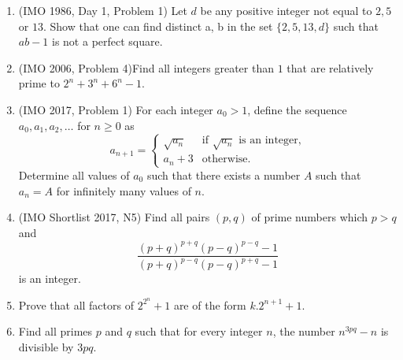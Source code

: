 \documentclass[a4paper,oneside,12 pt]{book}
\theoremstyle{definition}
\theoremstyle{definition}
\theoremstyle{definition}
\begin{document}
\begin{enumerate}
\item (IMO 1986, Day 1, Problem 1) Let $d$ be any positive integer not equal to $2, 5$ or $13$. Show that one can find distinct a, b in the set $\{2, 5, 13, d\}$ such that $ab − 1$ is not a perfect square.

\item (IMO 2006, Problem 4)Find all integers greater than $1$ that are relatively prime to $2^n+3^n+6^n-1.$

\item (IMO 2017, Problem 1) For each integer $a_0 > 1$, define the sequence $a_0, a_1, a_2, \ldots$ for $n \geq 0$ as
$$a_{n+1} = 
\begin{cases}
\sqrt{a_n} & \text{if } \sqrt{a_n} \text{ is an integer,} \\
a_n + 3 & \text{otherwise.}
\end{cases}
$$Determine all values of $a_0$ such that there exists a number $A$ such that $a_n = A$ for infinitely many values of $n$.

\item (IMO Shortlist 2017, N5) Find all pairs $(p,q)$ of prime numbers which $p>q$ and
$$\frac{(p+q)^{p+q}(p-q)^{p-q}-1}{(p+q)^{p-q}(p-q)^{p+q}-1}$$is an integer.

\item Prove that all factors of $2^{2^n}+1$ are of the form $k.2^{n+1}+1$.

\item Find all primes $p$ and $q$ such that for every integer $n$, the number $n^{3pq}-n$ is divisible by $3pq.$


\end{enumerate}
\end{document}
